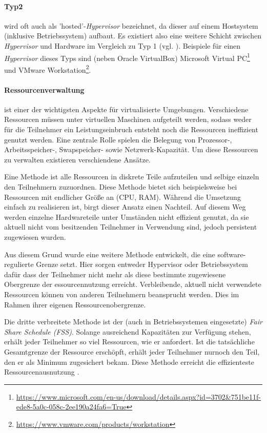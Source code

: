 \paragraph{Typ2} wird oft auch als 'hosted'-\textit{Hypervisor} bezeichnet, da dieser auf
einem Hostsystem (inklusive Betriebssystem) aufbaut. Es existiert also eine weitere Schicht
zwischen \textit{Hypervisor} und Hardware im Vergleich zu Typ 1 (vgl. ).
Beispiele für einen \textit{Hypervisor} dieses Typs sind (neben Oracle VirtualBox) Microsoft
Virtual PC\footnote{\url{https://www.microsoft.com/en-us/download/details.aspx?id=3702&751be11f-ede8-5a0c-058c-2ee190a24fa6=True}} und
VMware Workstation\footnote{\url{https://www.vmware.com/products/workstation}}.

\paragraph{Ressourcenverwaltung} ist einer der wichtigsten Aspekte für virtualisierte Umgebungen.
Verschiedene Ressourcen müssen unter virtuellen Maschinen aufgeteilt werden, sodass weder für die
Teilnehmer ein Leistungseinbruch entsteht noch die Ressourcen ineffizient genutzt werden.
Eine zentrale Rolle spielen die Belegung von Prozessor-, Arbeitsspeicher-,
Swapspeicher- sowie Netzwerk-Kapazität. Um diese Ressourcen zu verwalten existieren verschiendene
Ansätze.

Eine Methode ist alle Ressourcen in diskrete Teile aufzuteilen und selbige einzeln den Teilnehmern
zuzuordnen. Diese Methode bietet sich beispielsweise bei Ressourcen mit endlicher Größe an
(CPU, RAM). Während die Umsetzung einfach zu realisieren ist, birgt dieser Ansatz einen Nachteil.
Auf diesem Weg werden einzelne Hardwareteile unter Umständen nicht effizient genutzt,
da sie aktuell nicht vom besitzenden Teilnehmer in Verwendung sind, jedoch persistent zugewiesen wurden.

Aus diesem Grund wurde eine weitere Methode entwickelt, die eine software-regulierte Grenze setzt.
Hier sorgen entweder Hypervisor oder Betriebssystem dafür dass der Teilnehmer nicht mehr als
diese bestimmte zugewiesene Obergrenze der essourcennutzung erreicht. Verbleibende, aktuell
nicht verwendete Ressourcen können von anderen Teilnehmern beansprucht werden. Dies im Rahmen
ihrer eigenen Ressourcenobergrenze\cite{victor10}.

Die dritte verbreitete Methode ist der (auch in Betriebssystemen eingesetzte)
\textit{Fair Share Schedule (FSS)}. Solange ausreichend Kapazitäten zur Verfügung stehen,
erhält jeder Teilnehmer so viel Ressourcen, wie er anfordert. Ist die tatsächliche Gesamtgrenze der
Ressource erschöpft, erhält jeder Teilnehmer nurnoch den Teil, den er als Minimum zugesichert bekam.
Diese Methode erreicht die effizienteste Ressourcenausnutzung \cite{victor10}.

